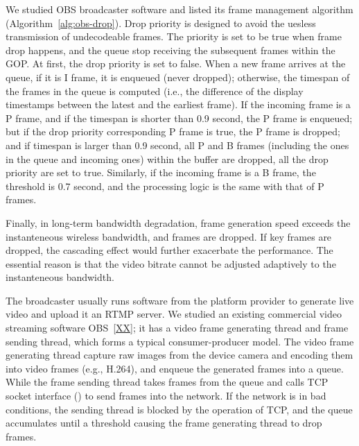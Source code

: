 We studied OBS broadcaster software and listed its frame management algorithm (Algorithm~\ref{alg:obs-drop}). Drop priority is designed to avoid the uesless transmission of undecodeable frames. The priority is set to be true when frame drop happens, and the queue stop receiving the subsequent frames within the GOP. At first, the drop priority is set to false. When a new frame arrives at the queue, if it is I frame, it is enqueued (never dropped); otherwise, the timespan of the frames in the queue is computed (i.e., the difference of the display timestamps between the latest and the earliest frame). If the incoming frame is a P frame, and if the timespan is shorter than 0.9 second, the P frame is enqueued; but if the drop priority corresponding P frame is true, the P frame is dropped; and if timespan is larger than 0.9 second, all P and B frames (including the ones in the queue and incoming ones) within the buffer are dropped, all the drop priority are set to true. Similarly, if the incoming frame is a B frame, the threshold is 0.7 second, and the processing logic is the same with that of P frames.

Finally, in long-term bandwidth degradation, frame generation speed exceeds the instanteneous wireless bandwidth, and frames are dropped. If key frames are dropped, the cascading effect would further exacerbate the performance. The essential reason is that the video bitrate cannot be adjusted adaptively to the instanteneous bandwidth.

\iffalse

The broadcaster usually runs software from the platform provider to generate live video and upload it an RTMP server. We studied an existing commercial video streaming software OBS~\ref{XX}; it has a video frame generating thread and frame sending thread, which forms a typical consumer-producer model. The video frame generating thread capture raw images from the device camera and encoding them into video frames (e.g., H.264), and enqueue the generated frames into a queue. While the frame sending thread takes frames from the queue and calls TCP socket interface (\mywrite) to send frames into the network. If the network is in bad conditions, the sending thread is blocked by the \mywrite operation of TCP, and the queue accumulates until a threshold causing the frame generating thread to drop frames.


